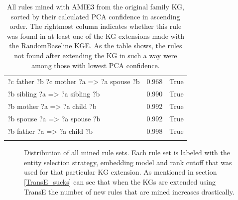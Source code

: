 \begin{longtable}{lrl}
      ?c  father  ?b  ?c  mother  ?a   => ?a  spouse  ?b &           0.968 &                     True \\
                    ?b  sibling  ?a   => ?a  sibling  ?b &           0.990 &                     True \\
                       ?b  mother  ?a   => ?a  child  ?b &           0.992 &                     True \\
                      ?b  spouse  ?a   => ?a  spouse  ?b &           0.992 &                     True \\
                       ?b  father  ?a   => ?a  child  ?b &           0.998 &                     True \\
\bottomrule
\caption{All rules mined with AMIE3 from the original family KG, sorted by their calculated PCA confidence in ascending order. The rightmost column indicates whether this rule was found in at least one of the KG extensions made with the RandomBaseline KGE. As the table shows, the rules not found after extending the KG in such a way were among those with lowest PCA confidence.}
\label{original_rules_found_by_baseline_family}
\end{longtable}


\begin{figure}[htbp]
\centering
    \centering
    
    \caption[Dist. of all sets of mined rules.]{Distribution of all mined rule sets. Each rule set is labeled with the entity selection strategy, embedding model and rank cutoff that was used for that particular KG extension. As mentioned in section \ref{TransE_sucks} can see that when the KGs are extended using TransE the number of new rules that are mined increases drastically.}
    \label{all_sets}
\end{figure}


